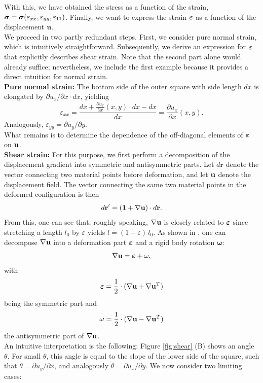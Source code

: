 With this, we have obtained the stress as a function of the strain, $\boldsymbol{\sigma} = \boldsymbol{\sigma}(\varepsilon_{xx}, \varepsilon_{yy}, \varepsilon_{11})$. Finally, we want to express the strain $\boldsymbol{\varepsilon}$ as a function of the displacement $\mathbf{u}$.\\
We proceed in two partly redundant steps. First, we consider pure normal strain, which is intuitively straightforward. Subsequently, we derive an expression for $\boldsymbol{\varepsilon}$ that explicitly describes shear strain. Note that the second part alone would already suffice; nevertheless, we include the first example because it provides a direct intuition for normal strain.\\
\textbf{Pure normal strain:} The bottom side of the outer square with side length $dx$ is elongated by $\partial u_x/\partial x\cdot dx$, yielding
\begin{equation*}
\varepsilon_{xx}=\frac{dx+\frac{\partial u_x}{\partial x}(x,y)\cdot dx-dx}{dx}=\frac{\partial u_x}{\partial x}(x,y).
\end{equation*}
Analogously, $\varepsilon_{yy}=\partial u_y/\partial y$.\\
What remains is to determine the dependence of the off-diagonal elements of $\boldsymbol{\varepsilon}$ on $\mathbf{u}$.\\
\textbf{Shear strain:} For this purpose, we first perform a decomposition of the displacement gradient into symmetric and antisymmetric parts. Let $d\mathbf{r}$ denote the vector connecting two material points before deformation, and let $\mathbf{u}$ denote the displacement field. The vector connecting the same two material points in the deformed configuration is then
\begin{equation}
d\mathbf{r}'=(\mathbf{1}+\nabla\mathbf{u} )\cdot d\mathbf{r}.
\label{eq:nabla_u}
\end{equation}
From this, one can see that, roughly speaking, $\nabla\mathbf{u}$ is closely related to $\boldsymbol{\varepsilon}$ since stretching a length $l_0$ by $\varepsilon$ yields $l=(1+\varepsilon)\, l_0$. As shown in \cite{fung2001classical}, one can decompose $\nabla \mathbf{u}$ into a deformation part $\boldsymbol{\varepsilon}$ and a rigid body rotation $\mathbf{\omega}$:
\begin{equation*}
\nabla\mathbf{u} = \boldsymbol{\varepsilon} + \mathbf{\omega},
\end{equation*}
with
\begin{equation}
\boldsymbol{\varepsilon}=\frac{1}{2}\cdot (\nabla\mathbf{u} + \nabla\mathbf{u}^T)
\label{eq}
\end{equation}
being the symmetric part and $$\mathbf{\omega}=\frac{1}{2}\cdot (\nabla\mathbf{u} - \nabla\mathbf{u}^T)$$ the antisymmetric part of $\nabla\mathbf{u}$.\\
An intuitive interpretation is the following: Figure \ref{fig:shear} (B) shows an angle $\theta$. For small $\theta$, this angle is equal to the slope of the lower side of the square, such that $\theta=\partial u_y / \partial x$, and analogously $\tilde\theta=\partial u_x / \partial y$. We now consider two limiting cases:\\

